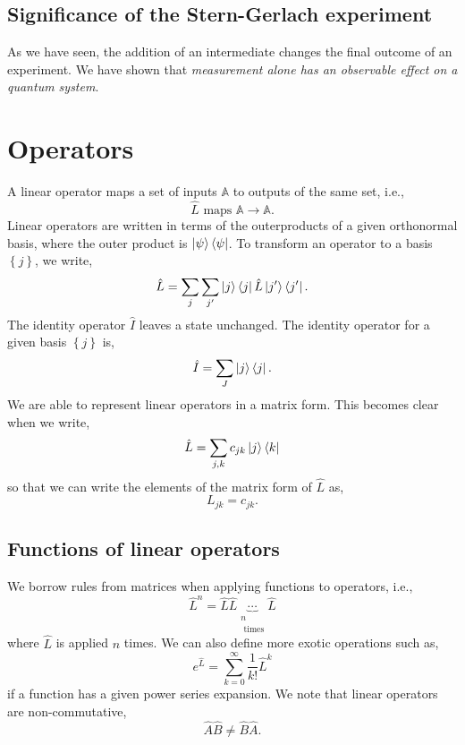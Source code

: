 \documentclass{book}
\begin{document}
\subsection*{Significance of the Stern-Gerlach experiment}
As we have seen, the addition of an intermediate changes the final outcome of an experiment. We have shown that \textit{measurement alone has an observable effect on a quantum system}.
\section{Operators}
A linear operator maps a set of inputs $\mathbb{A}$ to outputs of the same set, i.e.,
\begin{equation}
	\hat{L} \text{ maps } \mathbb{A} \to \mathbb{A}.
\end{equation}
Linear operators are written in terms of the outerproducts of a given orthonormal basis, where the outer product is $\ket{\psi}\bra{\psi}$. To transform an operator to a basis $\left\{j\right\}$, we write,
\begin{equation}
	\hat{L} = \sum_j\sum_{j'}\ket{j}\bra{j}\hat{L}\ket{j'}\bra{j'}.
\end{equation}
The identity operator $\hat{I}$ leaves a state unchanged. The identity operator for a given basis $\left\{j\right\}$ is,
\begin{equation}
	\hat{I} = \sum_J\ket{j}\bra{j}.
\end{equation}
We are able to represent linear operators in a matrix form. This becomes clear when we write,
\begin{equation}
	\hat{L} = \sum_{j,k}c_{jk}\ket{j}\bra{k}
\end{equation}
so that we can write the elements of the matrix form of $\hat{L}$ as,
\begin{equation}
	L_{jk} = c_{jk}.
\end{equation}
\subsection{Functions of linear operators}
We borrow rules from matrices when applying functions to operators, i.e.,
\begin{equation}
	\hat{L}^n = \hat{L}\hat{L}\underbrace{\cdots}_{\substack{n\\\text{ times}}}\hat{L}
\end{equation}
where $\hat{L}$ is applied $n$ times. We can also define more exotic operations such as,
\begin{equation}
	e^{\hat{L}} = \sum_{k=0}^{\infty}\frac{1}{k!}\hat{L}^k
\end{equation}
if a function has a given power series expansion. We note that linear operators are non-commutative,
\begin{equation}
	\hat{A}\hat{B} \neq \hat{B}\hat{A}.
\end{equation}
\end{document}
